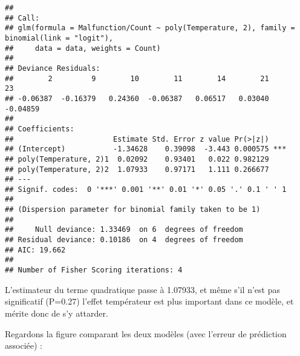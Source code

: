 \documentclass[]{article}
\begin{document}
\begin{verbatim}
## 
## Call:
## glm(formula = Malfunction/Count ~ poly(Temperature, 2), family = binomial(link = "logit"), 
##     data = data, weights = Count)
## 
## Deviance Residuals: 
##        2         9        10        11        14        21        23  
## -0.06387  -0.16379   0.24360  -0.06387   0.06517   0.03040  -0.04859  
## 
## Coefficients:
##                       Estimate Std. Error z value Pr(>|z|)    
## (Intercept)           -1.34628    0.39098  -3.443 0.000575 ***
## poly(Temperature, 2)1  0.02092    0.93401   0.022 0.982129    
## poly(Temperature, 2)2  1.07933    0.97171   1.111 0.266677    
## ---
## Signif. codes:  0 '***' 0.001 '**' 0.01 '*' 0.05 '.' 0.1 ' ' 1
## 
## (Dispersion parameter for binomial family taken to be 1)
## 
##     Null deviance: 1.33469  on 6  degrees of freedom
## Residual deviance: 0.10186  on 4  degrees of freedom
## AIC: 19.662
## 
## Number of Fisher Scoring iterations: 4
\end{verbatim}

L'estimateur du terme quadratique passe à 1.07933, et même s'il n'est
pas significatif (P=0.27) l'effet températeur est plus important dans ce
modèle, et mérite donc de s'y attarder.

Regardons la figure comparant les deux modèles (avec l'erreur de
prédiction associée) :
\end{document}
